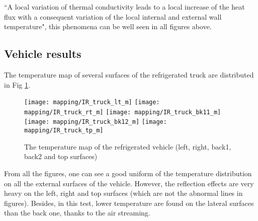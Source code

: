 ``A local variation of thermal conductivity leads to a local increase of the heat flux with a consequent variation of the local internal and external wall temperature"\citep{rossi2009k}, this phenomena can be well seen in all figures above.

\subsection{Vehicle results}
The temperature map of several surfaces of the refrigerated truck are distributed in Fig \ref{IR_truck}.
\begin{figure}[!htbp]
	\centering
	\texttt{[image: mapping/IR\_truck\_lt\_m]}
	\hspace{6pt}
	\texttt{[image: mapping/IR\_truck\_rt\_m]}
	\vspace{3pt}
	\texttt{[image: mapping/IR\_truck\_bk11\_m]}
	\hspace{6pt}
	\texttt{[image: mapping/IR\_truck\_bk12\_m]}
	\texttt{[image: mapping/IR\_truck\_tp\_m]}
	\caption{The temperature map of the refrigerated vehicle (left, right, back1, back2 and top surfaces)}
	\label{IR_truck}
\end{figure}
From all the figures, one can see a good uniform of the temperature distribution on all the external surfaces of the vehicle. However, the reflection effects are very heavy on the left, right and top surfaces (which are not the abnormal lines in figures). Besides, in this test, lower temperature are found on the lateral surfaces than the back one, thanks to the air streaming.

